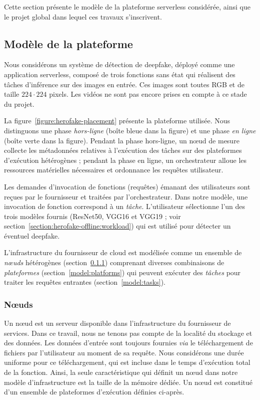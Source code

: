 Cette section présente le modèle de la plateforme serverless considérée, ainsi que le projet global dans lequel ces travaux s'inscrivent.

\subsection{Modèle de la plateforme}

Nous considérons un système de détection de deepfake, déployé comme une application serverless, composé de trois fonctions sans état qui réalisent des tâches d'inférence sur des images en entrée. Ces images sont toutes RGB et de taille $224 \cdot 224$ pixels. Les vidéos ne sont pas encore prises en compte à ce stade du projet.

La figure~\ref{figure:herofake-placement} présente la plateforme utilisée. Nous distinguons une phase \textit{hors-ligne} (boîte bleue dans la figure) et une phase \textit{en ligne} (boîte verte dans la figure). Pendant la phase hors-ligne, un nœud de mesure collecte les métadonnées relatives à l'exécution des tâches sur des plateformes d'exécution hétérogènes ; pendant la phase en ligne, un orchestrateur alloue les ressources matérielles nécessaires et ordonnance les requêtes utilisateur.

Les demandes d'invocation de fonctions (requêtes) émanant des utilisateurs sont reçues par le fournisseur et traitées par l'orchestrateur. Dans notre modèle, une invocation de fonction correspond à un \textit{tâche}. L'utilisateur sélectionne l'un des trois modèles fournis (ResNet50, VGG16 et VGG19 ; voir section~\ref{section:herofake-offline:workload}) qui est utilisé pour détecter un éventuel deepfake.

L'infrastructure du fournisseur de cloud est modélisée comme un ensemble de \textit{nœuds} hétérogènes (section~\ref{model:nodes}) comprenant diverses combinaisons de \textit{plateformes} (section~\ref{model:platforms}) qui peuvent exécuter des \textit{tâches} pour traiter les requêtes entrantes (section~\ref{model:tasks}).

\subsubsection{Nœuds}
\label{model:nodes}

Un nœud est un serveur disponible dans l'infrastructure du fournisseur de services. Dans ce travail, nous ne tenons pas compte de la localité du stockage et des données. Les données d'entrée sont toujours fournies \textit{via} le téléchargement de fichiers par l'utilisateur au moment de sa requête. Nous considérons une durée uniforme pour ce téléchargement, qui est incluse dans le temps d'exécution total de la fonction. Ainsi, la seule caractéristique qui définit un nœud dans notre modèle d'infrastructure est la taille de la mémoire dédiée. Un nœud est constitué d'un ensemble de plateformes d'exécution définies ci-après.

